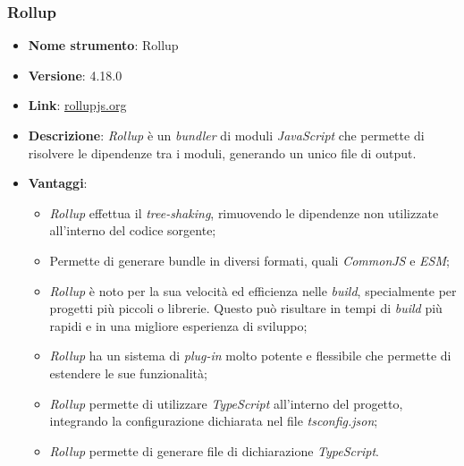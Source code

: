\subsubsection{Rollup}
\begin{itemize}
    \item \textbf{Nome strumento}: Rollup
    \item \textbf{Versione}: 4.18.0
    \item \textbf{Link}: \href{https://rollupjs.org/}{rollupjs.org}
    \item \textbf{Descrizione}: \textit{Rollup} è un \textit{\gls{bundler}\glox} di moduli \textit{JavaScript} che permette di risolvere le dipendenze tra i moduli, generando un unico file di output.
    \item \textbf{Vantaggi}:
          \begin{itemize}
              \item \textit{Rollup} effettua il \textit{\gls{tree-shaking}\glox}, rimuovendo le dipendenze non utilizzate all'interno del codice sorgente;
              \item Permette di generare bundle in diversi formati, quali \textit{CommonJS} e \textit{ESM};
              \item \textit{Rollup} è noto per la sua velocità ed efficienza nelle \textit{build}, specialmente per progetti più piccoli o librerie.
                    Questo può risultare in tempi di \textit{build} più rapidi e in una migliore esperienza di sviluppo;
              \item \textit{Rollup} ha un sistema di \textit{plug-in} molto potente e flessibile che permette di estendere le sue funzionalità;
              \item \textit{Rollup} permette di utilizzare \textit{TypeScript} all'interno del progetto, integrando la configurazione dichiarata nel file \textit{tsconfig.json};
              \item \textit{Rollup} permette di generare file di dichiarazione \textit{TypeScript}.
          \end{itemize}
\end{itemize}

